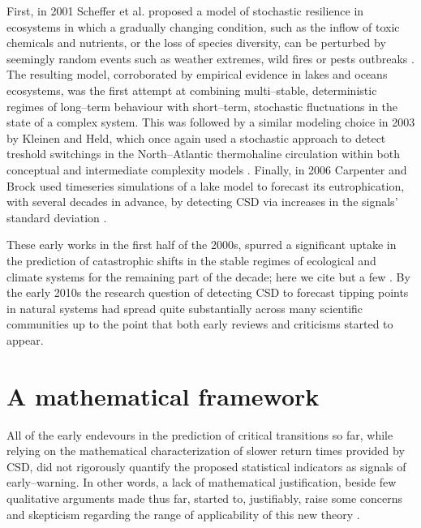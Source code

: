 First, in 2001 Scheffer et al. proposed a model of stochastic resilience in ecosystems in which a gradually changing condition, such as the inflow of toxic chemicals and nutrients, or the loss of species diversity, can be perturbed by seemingly random events such as weather extremes, wild fires or pests outbreaks \cite{Scheffer2001}. 
The resulting model, corroborated by empirical evidence in lakes and oceans ecosystems, was the first attempt at combining multi--stable, deterministic regimes of long--term behaviour with short--term, stochastic fluctuations in the state of a complex system.
This was followed by a similar modeling choice in 2003 by Kleinen and Held, which once again used a stochastic approach to detect treshold switchings in the North--Atlantic thermohaline circulation within both conceptual \cite{Kleinen2003} and intermediate complexity models \cite{Held2004}.
Finally, in 2006 Carpenter and Brock used timeseries simulations of a lake model to forecast its eutrophication, with several decades in advance, by detecting CSD via increases in the signals' standard deviation \cite{Carpenter2006}.

These early works in the first half of the 2000s, spurred a significant uptake in the prediction of catastrophic shifts in the stable regimes of ecological and climate systems for the remaining part of the decade; here we cite but a few \cite{Livina2007,vanNes2007,Carpenter2008,Dakos2008,Guttal2008,Biggs2009,Chisholm2009,Guttal2008,Brock2010,Carpenter2010,Dakos2010,Drake2010}.
By the early 2010s the research question of detecting CSD to forecast tipping points in natural systems had spread quite substantially across many scientific communities up to the point that both early reviews \cite{Scheffer2009,Scheffer2012} and criticisms \cite{Hastings2010,Ditlevsen2010} started to appear.

\section{A mathematical framework}
All of the early endevours in the prediction of critical transitions so far, while relying on the mathematical characterization of slower return times provided by CSD, did not rigorously quantify the proposed statistical indicators as signals of early--warning.
In other words, a lack of mathematical justification, beside few qualitative arguments made thus far, started to, justifiably, raise some concerns and skepticism regarding the range of applicability of this new theory \cite{Boettiger2013,Boerlijst2013,Kefi2013,Bos2014}.


